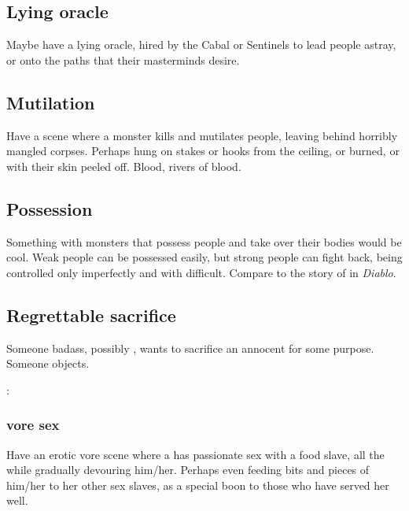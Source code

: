 \subsection{Lying oracle}
Maybe have a lying oracle, hired by the Cabal or Sentinels to lead people astray, or onto the paths that their masterminds desire. 









\subsection{Mutilation}
Have a scene where a monster kills and mutilates people, leaving behind horribly mangled corpses. Perhaps hung on stakes or hooks from the ceiling, or burned, or with their skin peeled off. Blood, rivers of blood.









\subsection{Possession}
Something with monsters that possess people and take over their bodies would be cool. Weak people can be possessed easily, but strong people can fight back, being controlled only imperfectly and with difficult. Compare to the story of  in \emph{Diablo}. 









\subsection{Regrettable sacrifice}
Someone badass, possibly , wants to sacrifice an annocent for some purpose. Someone objects. 

\Ishnaruchaefir: 





\subsubsection{\Resvil{} vore sex}
Have an erotic vore scene where a \resvil{} has passionate sex with a food slave, all the while gradually devouring him/her. 
Perhaps even feeding bits and pieces of him/her to her other sex slaves, as a special boon to those who have served her well. 

